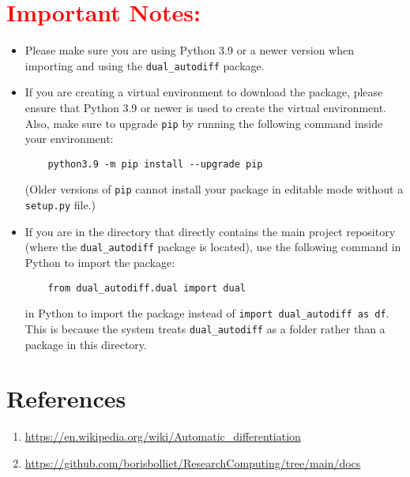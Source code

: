 \documentclass[a4paper,12pt]{article}
\begin{document}
\section{\textcolor{red}{Important Notes:}}

\begin{itemize}
    \item Please make sure you are using Python 3.9 or a newer version when importing and using the \texttt{dual\_autodiff} package.
    
    \item If you are creating a virtual environment to download the package, please ensure that Python 3.9 or newer is used to create the virtual environment. Also, make sure to upgrade \texttt{pip} by running the following command inside your environment:
    \begin{verbatim}
    python3.9 -m pip install --upgrade pip
    \end{verbatim}
    (Older versions of \texttt{pip} cannot install your package in editable mode without a \texttt{setup.py} file.)
    
    \item If you are in the directory that directly contains the main project repository (where the \texttt{dual\_autodiff} package is located), use the following command in Python to import the package:
    \begin{verbatim}
    from dual_autodiff.dual import dual
    \end{verbatim}
    in Python to import the package instead of \texttt{import dual\_autodiff as df}. This is because the system treats \texttt{dual\_autodiff} as a folder rather than a package in this directory.
\end{itemize}

\section{References}
\begin{enumerate}
    \item \url{https://en.wikipedia.org/wiki/Automatic_differentiation}
    \item \url{https://github.com/borisbolliet/ResearchComputing/tree/main/docs}
\end{enumerate}
\end{document}
